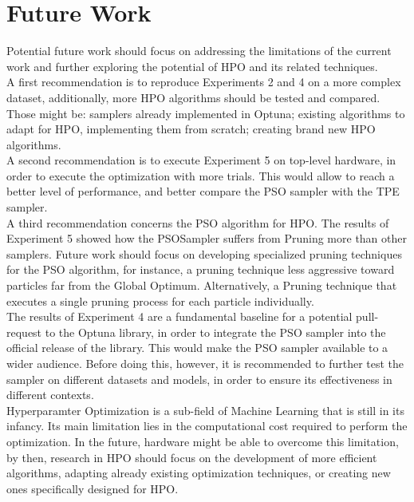 \section{Future Work}

Potential future work should focus on addressing the limitations of the current work and further exploring the potential of HPO and its related techniques.
\\[0.3cm]A first recommendation is to reproduce Experiments 2 and 4 on a more complex dataset, additionally, more HPO algorithms should be tested and compared. Those might be: samplers already implemented in Optuna; existing algorithms to adapt for HPO, implementing them from scratch; creating brand new HPO algorithms.
\\[0.3cm]A second recommendation is to execute Experiment 5 on top-level hardware, in order to execute the optimization with more trials. This would allow to reach a better level of performance, and better compare the PSO sampler with the TPE sampler.
\\[0.3cm]A third recommendation concerns the PSO algorithm for HPO. The results of Experiment 5 showed how the PSOSampler suffers from Pruning more than other samplers. Future work should focus on developing specialized pruning techniques for the PSO algorithm, for instance, a pruning technique less aggressive toward particles far from the Global Optimum. Alternatively, a Pruning technique that executes a single pruning process for each particle individually. 
\\[0.3cm]The results of Experiment 4 are a fundamental baseline for a potential pull-request to the Optuna library, in order to integrate the PSO sampler into the official release of the library. This would make the PSO sampler available to a wider audience. Before doing this, however, it is recommended to further test the sampler on different datasets and models, in order to ensure its effectiveness in different contexts.
\\[0.3cm]Hyperparamter Optimization is a sub-field of Machine Learning that is still in its infancy. Its main limitation lies in the computational cost required to perform the optimization. In the future, hardware might be able to overcome this limitation, by then, research in HPO should focus on the development of more efficient algorithms, adapting already existing optimization techniques, or creating new ones specifically designed for HPO.   
